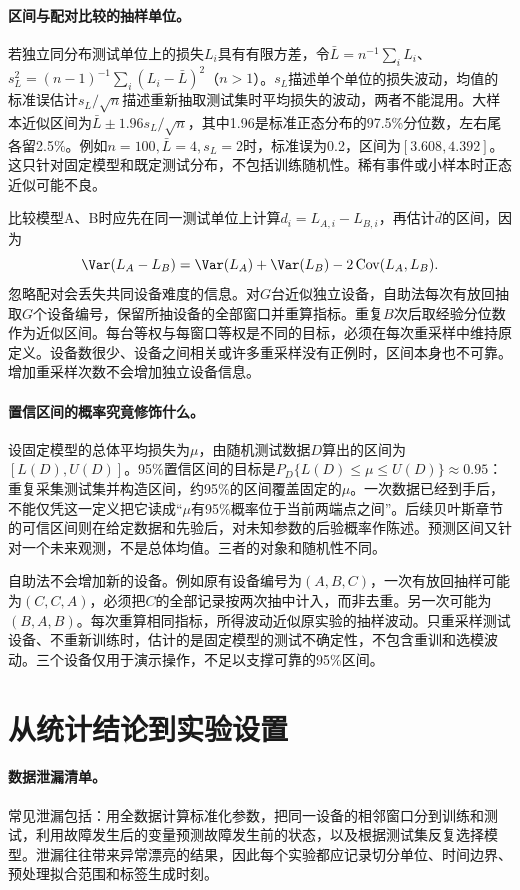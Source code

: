 \paragraph{区间与配对比较的抽样单位。}
若独立同分布测试单位上的损失$L_i$具有有限方差，令$\bar L=n^{-1}\sum_iL_i$、$s_L^2=(n-1)^{-1}\sum_i(L_i-\bar L)^2$（$n>1$）。$s_L$描述单个单位的损失波动，均值的标准误估计$s_L/\sqrt n$描述重新抽取测试集时平均损失的波动，两者不能混用。大样本近似区间为$\bar L\pm1.96s_L/\sqrt n$，其中1.96是标准正态分布的97.5\%分位数，左右尾各留2.5\%。例如$n=100,\bar L=4,s_L=2$时，标准误为0.2，区间为$[3.608,4.392]$。这只针对固定模型和既定测试分布，不包括训练随机性。稀有事件或小样本时正态近似可能不良。

比较模型A、B时应先在同一测试单位上计算$d_i=L_{A,i}-L_{B,i}$，再估计$\bar d$的区间，因为
\begin{equation}
 \Var(L_A-L_B)=\Var(L_A)+\Var(L_B)-2\operatorname{Cov}(L_A,L_B).
\end{equation}
忽略配对会丢失共同设备难度的信息。对$G$台近似独立设备，自助法每次有放回抽取$G$个设备编号，保留所抽设备的全部窗口并重算指标。重复$B$次后取经验分位数作为近似区间。每台等权与每窗口等权是不同的目标，必须在每次重采样中维持原定义。设备数很少、设备之间相关或许多重采样没有正例时，区间本身也不可靠。增加重采样次数不会增加独立设备信息。

\paragraph{置信区间的概率究竟修饰什么。}
设固定模型的总体平均损失为$\mu$，由随机测试数据$D$算出的区间为$[L(D),U(D)]$。95\%置信区间的目标是$P_D\{L(D)\leq\mu\leq U(D)\}\approx0.95$：重复采集测试集并构造区间，约95\%的区间覆盖固定的$\mu$。一次数据已经到手后，不能仅凭这一定义把它读成“$\mu$有95\%概率位于当前两端点之间”。后续贝叶斯章节的可信区间则在给定数据和先验后，对未知参数的后验概率作陈述。预测区间又针对一个未来观测，不是总体均值。三者的对象和随机性不同。

自助法不会增加新的设备。例如原有设备编号为$(A,B,C)$，一次有放回抽样可能为$(C,C,A)$，必须把$C$的全部记录按两次抽中计入，而非去重。另一次可能为$(B,A,B)$。每次重算相同指标，所得波动近似原实验的抽样波动。只重采样测试设备、不重新训练时，估计的是固定模型的测试不确定性，不包含重训和选模波动。三个设备仅用于演示操作，不足以支撑可靠的95\%区间。

\section{从统计结论到实验设置}
\paragraph{数据泄漏清单。}
常见泄漏包括：用全数据计算标准化参数，把同一设备的相邻窗口分到训练和测试，利用故障发生后的变量预测故障发生前的状态，以及根据测试集反复选择模型。泄漏往往带来异常漂亮的结果，因此每个实验都应记录切分单位、时间边界、预处理拟合范围和标签生成时刻。

